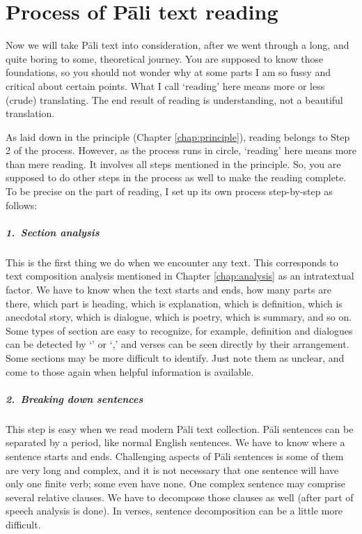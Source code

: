 \chapter{Process of P\=ali text reading}\label{chap:readproc}

Now we will take P\=ali text into consideration, after we went through a long, and quite boring to some, theoretical journey. You are supposed to know those foundations, so you should not wonder why at some parts I am so fussy and critical about certain points. What I call `reading' here means more or less (crude) translating. The end result of reading is understanding, not a beautiful translation.

As laid down in the principle (Chapter \ref{chap:principle}), reading belongs to Step 2 of the process. However, as the process runs in circle, `reading' here means more than mere reading. It involves all steps mentioned in the principle. So, you are supposed to do other steps in the process as well to make the reading complete. To be precise on the part of reading, I set up its own process step-by-step as follows:

\paragraph*{1.\ Section analysis} This is the first thing we do when we encounter any text. This corresponds to text composition analysis mentioned in Chapter \ref{chap:analysis} as an intratextual factor. We have to know when the text starts and ends, how many parts are there, which part is heading, which is explanation, which is definition, which is anecdotal story, which is dialogue, which is poetry, which is summary, and so on. Some types of section are easy to recognize, for example, definition and dialogues can be detected by `' or `,' and verses can be seen directly by their arrangement. Some sections may be more difficult to identify. Just note them as unclear, and come to those again when helpful information is available.

\paragraph*{2.\ Breaking down sentences} This step is easy when we read modern P\=ali text collection. P\=ali sentences can be separated by a period, like normal English sentences. We have to know where a sentence starts and ends. Challenging aspects of P\=ali sentences is some of them are very long and complex, and it is not necessary that one sentence will have only one finite verb; some even have none. One complex sentence may comprise several relative clauses. We have to decompose those clauses as well (after part of speech analysis is done). In verses, sentence decomposition can be a little more difficult.

